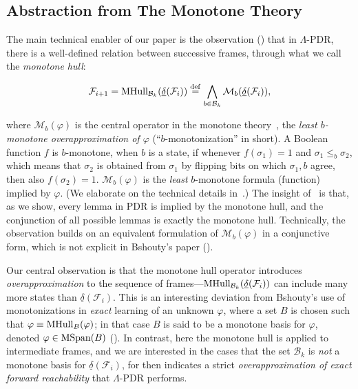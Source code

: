 \documentclass[acmsmall,screen]{acmart}
\newcommand{\tr}{\delta}
\newcommand{\Frame}{\mathcal{F}}
\newcommand{\eqdef}{\stackrel{\rm def}{=}}
\newcommand{\reflextr}[1]{\underline{#1}}
\newcommand{\postimage}[2]{{\reflextr{#1}}({#2})}
\newcommand{\bkwrch}[1]{\mathcal{B}_{#1}}
\newcommand{\monox}[2]{\mathcal{M}_{#2}({#1})}
\newcommand{\mspan}[1]{{\rm MSpan}({#1})}
\newcommand{\mhull}[2]{{\rm MHull}_{#2}({#1})}
\begin{document}
\subsection{Abstraction from The Monotone Theory}\label{sec:overview-monotone}
The main technical enabler of our paper is the observation () that in $\Lambda$-PDR, there is a well-defined relation between successive frames, through what we call the \emph{monotone hull}:
\vspace{-0.15cm}
\begin{tcolorbox}[boxsep=-4pt]
\begin{equation}
\label{eq:overview-next-frame}
	\Frame_{i+1} = \mhull{\postimage{\tr}{\Frame_i}}{\bkwrch{k}} \eqdef \bigwedge_{b \in \bkwrch{k}}{\monox{\postimage{\tr}{\Frame_i}}{b}},
\end{equation}
\end{tcolorbox}
\vspace{-0.15cm}
\noindent
%
where $\monox{\varphi}{b}$ is the central operator in the monotone theory~\cite{DBLP:journals/iandc/Bshouty95}, the \emph{least $b$-monotone overapproximation of $\varphi$} (``$b$-monotonization'' in short). A Boolean function $f$ is $b$-monotone, when $b$ is a state, if whenever $f(\sigma_1)=1$ and $\sigma_1 \leq_b \sigma_2$, which means that $\sigma_2$ is obtained from $\sigma_1$ by flipping bits on which $\sigma_1,b$ agree, then also $f(\sigma_2)=1$.
$\monox{\varphi}{b}$ is the \emph{least} $b$-monotone formula (function) implied by $\varphi$.
(We elaborate on the technical details in~.)
The insight of~ is that, as we show, every lemma in PDR is implied by the monotone hull, and the conjunction of all possible lemmas is exactly the monotone hull.
%
Technically, the observation builds on an equivalent formulation of $\monox{\varphi}{b}$ in a conjunctive form, which is not explicit in Bshouty's paper ().

Our central observation is that the monotone hull operator introduces \emph{overapproximation} to the sequence of frames---$\mhull{\postimage{\tr}{\Frame_i}}{\bkwrch{k}}$ can include many more states than $\postimage{\tr}{\Frame_i}$.
This is an interesting deviation from Bshouty's use of monotonizations in \emph{exact} learning of an unknown $\varphi$, %
where a set $B$ is chosen such that $\varphi \equiv \mhull{\varphi}{B}$; in that case $B$ is said to be a monotone basis for $\varphi$, denoted $\varphi \in \mspan{B}$ ().
In contrast, here the monotone hull is applied to intermediate frames, and we are interested in the cases that the set $\bkwrch{k}$ is \emph{not} a monotone basis for $\postimage{\tr}{\Frame_i}$, for then  indicates a strict \emph{overapproximation of exact forward reachability} that $\Lambda$-PDR performs.
%
%
%
%
%
%
%
%
%
%
%
%
%
%
%
%
%
\end{document}
